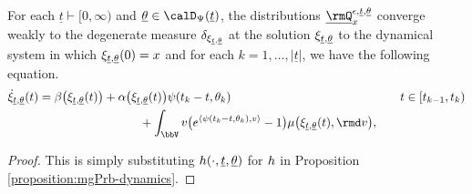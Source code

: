 \begin{corollary}
  \label{corollary:equivalence}
  For each $\underline t \vdash [0,\infty)$ and $\underline\twistVar \in \momentSpace(\underline t)$, the distributions $\fddPrb^{\epsilon,\underline t,\underline\twistVar}_\stateVar$ converge weakly to the degenerate measure $\delta_{\xi_{\underline t, \underline{\theta}}}$ at the solution $\xi_{\underline t, \underline{\theta}}$ to the dynamical system in which $\xi_{\underline t, \underline{\theta}}(0) = x$ and for each $k = 1, \ldots, |\underline t|$, we have the following equation.
  \begin{align*}
    &\dot\pathVar_{\underline t, \underline\twistVar}(t) = \begin{aligned}[t]
      &\affDrift\big(\pathVar_{\underline t, \underline\twistVar}(t) \big) + \affDiff\big(\pathVar_{\underline t, \underline\twistVar}(t)\big) \affPart(t_k - t, \twistVar_k) \\
      &\hspace{25mm}+ \int_\vecSpace \markVar \big( e^\prj{\affPart(t_k-t,\twistVar_k)}{\markVar} - 1 \big) \affJump\big(\pathVar_{\underline t, \underline\twistVar}(t), \rmd\markVar\big),
    \end{aligned} 
    &  \quad t \in [t_{k-1}, t_k)
  \end{align*}
\end{corollary}
\begin{proof}
  \label{proof:corollary:equivalence}
  This is simply substituting $h(\cdot, \underline t, \underline{\theta})$ for $h$ in Proposition \ref{proposition:mgPrb-dynamics}.
\end{proof}
